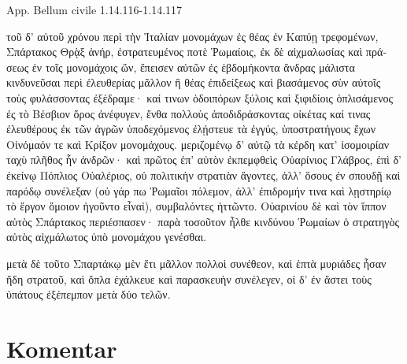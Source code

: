 App. Bellum civile 1.14.116-1.14.117


\medskip


{\large

\begin{greek}

\noindent  τοῦ δ' αὐτοῦ χρόνου περὶ τὴν Ἰταλίαν μονομάχων ἐς θέας ἐν Καπύῃ τρεφομένων, Σπάρτακος Θρᾲξ ἀνήρ, ἐστρατευμένος ποτὲ Ῥωμαίοις, ἐκ δὲ αἰχμαλωσίας καὶ πράσεως ἐν τοῖς μονομάχοις ὤν, ἔπεισεν αὐτῶν ἐς ἑβδομήκοντα ἄνδρας μάλιστα κινδυνεῦσαι περὶ ἐλευθερίας μᾶλλον ἢ θέας ἐπιδείξεως καὶ βιασάμενος σὺν αὐτοῖς τοὺς φυλάσσοντας ἐξέδραμε· καί τινων ὁδοιπόρων ξύλοις καὶ ξιφιδίοις ὁπλισάμενος ἐς τὸ Βέσβιον ὄρος ἀνέφυγεν, ἔνθα πολλοὺς ἀποδιδράσκοντας οἰκέτας καί τινας ἐλευθέρους ἐκ τῶν ἀγρῶν ὑποδεχόμενος ἐλῄστευε τὰ ἐγγύς, ὑποστρατήγους ἔχων Οἰνόμαόν τε καὶ Κρίξον μονομάχους. μεριζομένῳ δ' αὐτῷ τὰ κέρδη κατ' ἰσομοιρίαν ταχὺ πλῆθος ἦν ἀνδρῶν· καὶ πρῶτος ἐπ' αὐτὸν ἐκπεμφθεὶς Οὐαρίνιος Γλάβρος, ἐπὶ δ' ἐκείνῳ Πόπλιος Οὐαλέριος, οὐ πολιτικὴν στρατιὰν ἄγοντες, ἀλλ' ὅσους ἐν σπουδῇ καὶ παρόδῳ συνέλεξαν (οὐ γάρ πω Ῥωμαῖοι πόλεμον, ἀλλ' ἐπιδρομήν τινα καὶ λῃστηρίῳ τὸ ἔργον ὅμοιον ἡγοῦντο εἶναἰ), συμβαλόντες ἡττῶντο. Οὐαρινίου δὲ καὶ τὸν ἵππον αὐτὸς Σπάρτακος περιέσπασεν· παρὰ τοσοῦτον ἦλθε κινδύνου Ῥωμαίων ὁ στρατηγὸς αὐτὸς αἰχμάλωτος ὑπὸ μονομάχου γενέσθαι.

μετὰ δὲ τοῦτο Σπαρτάκῳ μὲν ἔτι μᾶλλον πολλοὶ συνέθεον, καὶ ἑπτὰ μυριάδες ἦσαν ἤδη στρατοῦ, καὶ ὅπλα ἐχάλκευε καὶ παρασκευὴν συνέλεγεν, οἱ δ' ἐν ἄστει τοὺς ὑπάτους ἐξέπεμπον μετὰ δύο τελῶν.

\end{greek}

}


\section*{Komentar}



